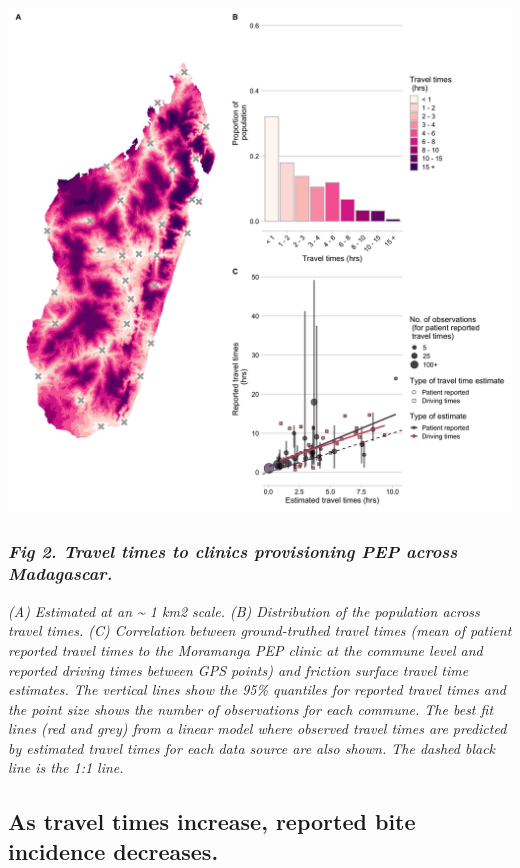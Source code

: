 \documentclass[
]{book}
\begin{document}
\includegraphics[width=0.9\linewidth]{figs/ch2/fig2}

\hypertarget{fig-2.-travel-times-to-clinics-provisioning-pep-across-madagascar.}{%
\subsubsection{\texorpdfstring{\emph{Fig 2. Travel times to clinics provisioning PEP across Madagascar.}}{Fig 2. Travel times to clinics provisioning PEP across Madagascar.}}\label{fig-2.-travel-times-to-clinics-provisioning-pep-across-madagascar.}}

\emph{(A) Estimated at an \textasciitilde{} 1 km2 scale. (B) Distribution of the population
across travel times. (C) Correlation between ground-truthed travel times
(mean of patient reported travel times to the Moramanga PEP clinic at
the commune level and reported driving times between GPS points) and
friction surface travel time estimates. The vertical lines show the 95\%
quantiles for reported travel times and the point size shows the number
of observations for each commune. The best fit lines (red and grey) from
a linear model where observed travel times are predicted by estimated
travel times for each data source are also shown. The dashed black line
is the 1:1 line.}

\hypertarget{as-travel-times-increase-reported-bite-incidence-decreases.}{%
\subsection{As travel times increase, reported bite incidence decreases.}\label{as-travel-times-increase-reported-bite-incidence-decreases.}}
\end{document}
